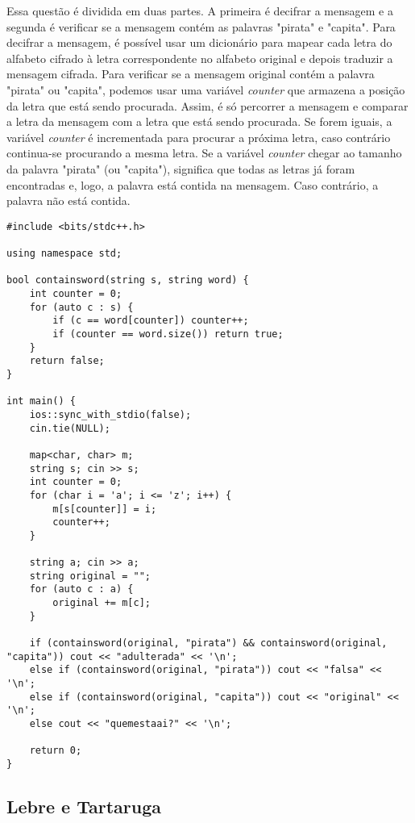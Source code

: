 \documentclass[11pt,fancychapters]{article}
\begin{document}
\noindent
Essa questão é dividida em duas partes. A primeira é decifrar a mensagem e a segunda é verificar se a mensagem contém as palavras "pirata" e "capita". Para decifrar a mensagem, é possível usar um dicionário para mapear cada letra do alfabeto cifrado à letra correspondente no alfabeto original e depois traduzir a mensagem cifrada. Para verificar se a mensagem original contém a palavra "pirata" ou "capita", podemos usar uma variável  \emph{counter} que armazena a posição da letra que está sendo procurada. Assim, é só percorrer a mensagem e comparar a letra da mensagem com a letra que está sendo procurada. Se forem iguais, a variável \emph{counter} é incrementada para procurar a próxima letra, caso contrário continua-se procurando a mesma letra. Se a variável \emph{counter} chegar ao tamanho da palavra "pirata" (ou "capita"), significa que todas as letras já foram encontradas e, logo, a palavra está contida na mensagem. Caso contrário, a palavra não está contida.\\
\begin{lstlisting}[style=c++]
#include <bits/stdc++.h>
 
using namespace std;
 
bool containsword(string s, string word) {
    int counter = 0;
    for (auto c : s) {
        if (c == word[counter]) counter++;
        if (counter == word.size()) return true;
    }
    return false;
}
 
int main() {
    ios::sync_with_stdio(false);
    cin.tie(NULL);
    
    map<char, char> m;
    string s; cin >> s;
    int counter = 0;
    for (char i = 'a'; i <= 'z'; i++) {
        m[s[counter]] = i;
        counter++;
    }
    
    string a; cin >> a;
    string original = "";
    for (auto c : a) {
        original += m[c];
    }
    
    if (containsword(original, "pirata") && containsword(original, "capita")) cout << "adulterada" << '\n';
    else if (containsword(original, "pirata")) cout << "falsa" << '\n';
    else if (containsword(original, "capita")) cout << "original" << '\n';
    else cout << "quemestaai?" << '\n';
 
    return 0;
}
\end{lstlisting}
\newpage
\begin{center}\section{Lebre e Tartaruga}\end{center}
\end{document}
